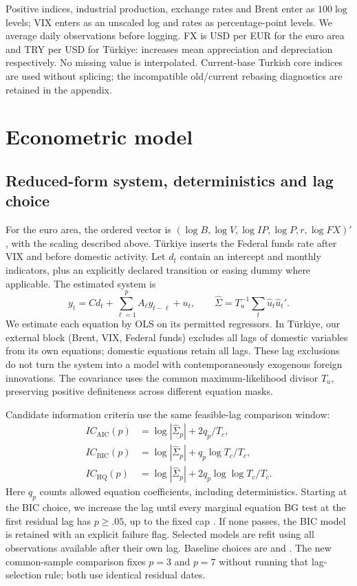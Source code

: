 Positive indices, industrial production, exchange rates and Brent enter as $100\log$ levels; VIX enters as an unscaled log and rates as percentage-point levels. We average daily observations before logging. FX is USD per EUR for the euro area and TRY per USD for Türkiye: increases mean appreciation and depreciation respectively. No missing value is interpolated. Current-base Turkish core indices are used without splicing; the incompatible old/current rebasing diagnostics are retained in the appendix.

\section{Econometric model}
\subsection{Reduced-form system, deterministics and lag choice}
For the euro area, the ordered vector is $(\log B,\log V,\log IP,\log P, r,\log FX)'$, with the scaling described above. Türkiye inserts the Federal funds rate after VIX and before domestic activity. Let $d_t$ contain an intercept and monthly indicators, plus an explicitly declared transition or easing dummy where applicable. The estimated system is
\begin{equation}
 y_t=C d_t+\sum_{\ell=1}^{p}A_\ell y_{t-\ell}+u_t,
 \qquad \widehat\Sigma=T_u^{-1}\sum_t\widehat u_t\widehat u_t'.
\end{equation}
We estimate each equation by OLS on its permitted regressors. In Türkiye, our external block (Brent, VIX, Federal funds) excludes all lags of domestic variables from its own equations; domestic equations retain all lags. These lag exclusions do not turn the system into a model with contemporaneously exogenous foreign innovations. The covariance uses the common maximum-likelihood divisor $T_u$, preserving positive definiteness across different equation masks.

Candidate information criteria use the same feasible-lag comparison window:
\begin{align}
 IC_{\mathrm{AIC}}(p)&=\log|\widehat\Sigma_p|+2q_p/T_c,\\
 IC_{\mathrm{BIC}}(p)&=\log|\widehat\Sigma_p|+q_p\log T_c/T_c,\\
 IC_{\mathrm{HQ}}(p)&=\log|\widehat\Sigma_p|+2q_p\log\log T_c/T_c.
\end{align}
Here $q_p$ counts allowed equation coefficients, including deterministics. Starting at the BIC choice, we increase the lag until every marginal equation BG test at the first residual lag has $p\geq .05$, up to the fixed cap \LagCap{}. If none passes, the BIC model is retained with an explicit failure flag. Selected models are refit using all observations available after their own lag. Baseline choices are \EALag{} and \TRLag{}. The new common-sample comparison fixes $p=3$ and $p=7$ without running that lag-selection rule; both use identical residual dates.

